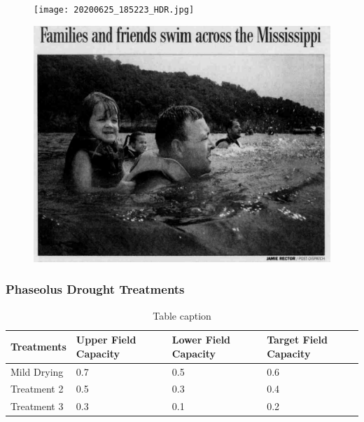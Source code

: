 \documentclass[12pt]{beamer}\usepackage[]{graphicx}\usepackage[]{color}
\begin{document}
\begin{frame}
\begin{figure}
\centering
\begin{minipage}{.5\textwidth}
  \centering
  \texttt{[image: 20200625\_185223\_HDR.jpg]}
  \label{fig:test1}
\end{minipage}%
\begin{minipage}{.5\textwidth}
  \centering
  \includegraphics[width=.4\linewidth]{Riverswim.png}
  \label{fig:test2}
\end{minipage}
\end{figure}
\end{frame}

\begin{frame}
\frametitle{Phaseolus Drought Treatments}
\begin{table}
\begin{tabular}{l l l l}
\toprule
\textbf{Treatments} & \textbf{Upper Field Capacity} & \textbf{Lower Field Capacity}& \textbf{Target Field Capacity}\\
\midrule
Mild Drying & 0.7 & 0.5 & 0.6 \\
Treatment 2 & 0.5 & 0.3 & 0.4\\
Treatment 3 & 0.3 & 0.1 & 0.2\\
\bottomrule
\end{tabular}
\caption{Table caption}
\end{table}
\end{frame}


\end{document}
